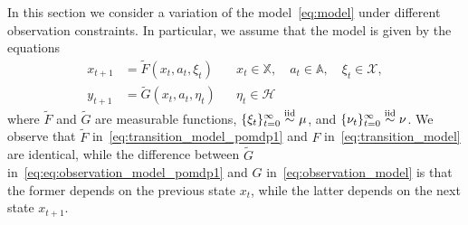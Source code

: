 \documentclass[11pt,onecolumn]{IEEEtran}  %
\newcommand{\Ab}{\mathbb{A}}
\newcommand{\Xb}{\mathbb{X}}
\newcommand{\Xc}{\mathcal{X}}
\newcommand{\Hc}{\mathcal{H}}
\newcommand{\iid}{\overset{\mathrm{iid}}{\sim}}
\DeclarePairedDelimiter{\set}{\{}{\}}
\theoremstyle{definition}
\begin{document}
In this section we consider a variation of the model~\eqref{eq:model} under different observation constraints.
In particular, we assume that the model is given by the equations
\begin{subequations} \label{eq:model_pomdp1}
    \begin{align}
        \label{eq:transition_model_pomdp1}
        x_{t+1} &= \tilde{F}(x_t, a_t, \xi_t)
        &&
        x_t \in \Xb, \quad
        a_t \in \Ab, \quad
        \xi_t \in \Xc, \\
        \label{eq:eq:observation_model_pomdp1}
        y_{t+1} &= \tilde{G}(x_t, a_t, \eta_t)
        &&
        \eta_t \in \Hc
    \end{align}
\end{subequations}
where $\tilde{F}$ and $\tilde{G}$ are measurable functions, $\set{\xi_{t}}_{t=0}^{\infty} \iid \mu$, and $\set{\nu_t}_{t=0}^{\infty} \iid \nu$. We observe that $\tilde{F}$ in~\eqref{eq:transition_model_pomdp1} and $F$ in~\eqref{eq:transition_model} are identical, while the difference between $\tilde{G}$ in~\eqref{eq:eq:observation_model_pomdp1} and $G$ in~\eqref{eq:observation_model} is that the former depends on the previous state $x_t$, while the latter depends on the next state $x_{t+1}$.
\end{document}
